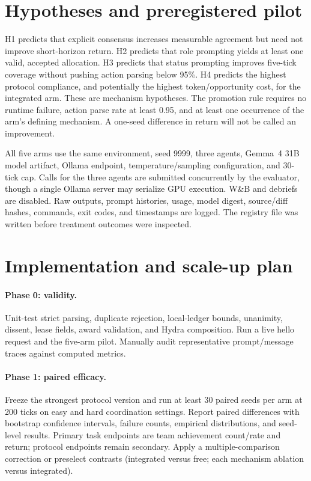 \documentclass[11pt]{article}
\begin{document}
\section{Hypotheses and preregistered pilot}
H1 predicts that explicit consensus increases measurable agreement but need not improve short-horizon return. H2 predicts that role prompting yields at least one valid, accepted allocation. H3 predicts that status prompting improves five-tick coverage without pushing action parsing below 95\%. H4 predicts the highest protocol compliance, and potentially the highest token/opportunity cost, for the integrated arm. These are mechanism hypotheses. The promotion rule requires no runtime failure, action parse rate at least 0.95, and at least one occurrence of the arm's defining mechanism. A one-seed difference in return will not be called an improvement.

All five arms use the same environment, seed 9999, three agents, Gemma~4 31B model artifact, Ollama endpoint, temperature/sampling configuration, and 30-tick cap. Calls for the three agents are submitted concurrently by the evaluator, though a single Ollama server may serialize GPU execution. W\&B and debriefs are disabled. Raw outputs, prompt histories, usage, model digest, source/diff hashes, commands, exit codes, and timestamps are logged. The registry file was written before treatment outcomes were inspected.

\section{Implementation and scale-up plan}
\paragraph{Phase 0: validity.} Unit-test strict parsing, duplicate rejection, local-ledger bounds, unanimity, dissent, lease fields, award validation, and Hydra composition. Run a live hello request and the five-arm pilot. Manually audit representative prompt/message traces against computed metrics.

\paragraph{Phase 1: paired efficacy.} Freeze the strongest protocol version and run at least 30 paired seeds per arm at 200 ticks on easy and hard coordination settings. Report paired differences with bootstrap confidence intervals, failure counts, empirical distributions, and seed-level results. Primary task endpoints are team achievement count/rate and return; protocol endpoints remain secondary. Apply a multiple-comparison correction or preselect contrasts (integrated versus free; each mechanism ablation versus integrated).
\end{document}
